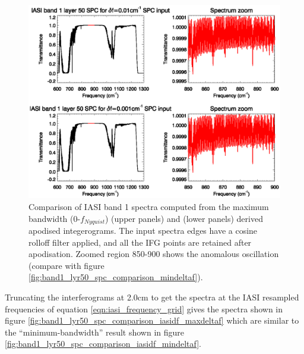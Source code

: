 \begin{figure}[htp]
  \centering
  \includegraphics[scale=0.8]{graphics/band1_lyr50_spc_comparison_maxdeltaf.eps}
  \caption{Comparison of IASI band 1 spectra computed from the maximum bandwidth (0-$f_{Nyquist}${\invcm})  (upper panels) and  (lower panels) derived apodised integerograms. The input spectra edges have a cosine rolloff filter applied, and all the IFG points are retained after apodisation. Zoomed region 850-900{\invcm} shows the anomalous oscillation (compare with figure \ref{fig:band1_lyr50_spc_comparison_mindeltaf}).}
  \label{fig:band1_lyr50_spc_comparison_maxdeltaf}
\end{figure}

Truncating the interferograms at 2.0cm to get the spectra at the IASI resampled frequencies of equation \ref{eqn:iasi_frequency_grid} gives the spectra shown in figure \ref{fig:band1_lyr50_spc_comparison_iasidf_maxdeltaf} which are similar to the ``minimum-bandwidth'' result shown in figure \ref{fig:band1_lyr50_spc_comparison_iasidf_mindeltaf}.


